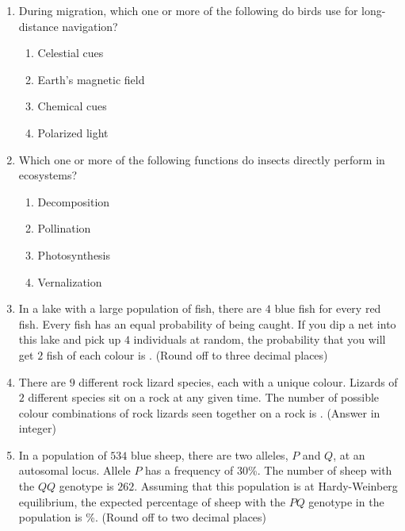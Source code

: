 \documentclass[journal]{IEEEtran}
\begin{document}
\begin{enumerate}
   
 \item During migration, which one or more of the following do birds use for long-distance navigation?
\begin{multicols}{2}
    \begin{enumerate}
        \item Celestial cues
        \item Earth's magnetic field
        \item Chemical cues
        \item Polarized light
    \end{enumerate}
    \end{multicols}

    \item Which one or more of the following functions do insects directly perform in ecosystems?
\begin{multicols}{2}
    \begin{enumerate}
        \item Decomposition
        \item Pollination
        \item Photosynthesis
        \item Vernalization
    \end{enumerate}
    \end{multicols}

    \item In a lake with a large population of fish, there are $4$ blue fish for every red fish.
Every fish has an equal probability of being caught. If you dip a net into this lake and pick up $4$ individuals at random, the probability that you will get $2$ fish of each colour is \underline{\hspace{3cm}}.
(Round off to three decimal places)

    \item There are $9$ different rock lizard species, each with a unique colour.
Lizards of $2$ different species sit on a rock at any given time.
The number of possible colour combinations of rock lizards seen together on a rock is \underline{\hspace{3cm}}.
(Answer in integer)

    \item In a population of $534$ blue sheep, there are two alleles, $P$ and $Q$, at an autosomal locus.
Allele $P$ has a frequency of $30$\%. The number of sheep with the $QQ$ genotype is $262$.
Assuming that this population is at Hardy-Weinberg equilibrium, the expected percentage of sheep with the $PQ$ genotype in the population is \underline{\hspace{3cm}} \%.
(Round off to two decimal places)
\end{enumerate}
\end{document}
